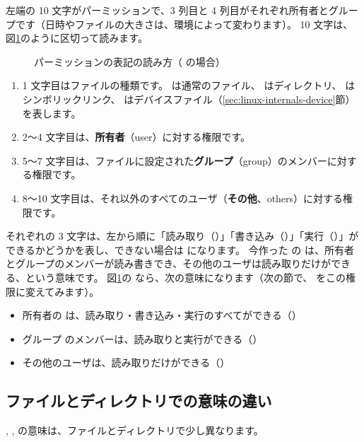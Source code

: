 左端の 10 文字がパーミッションで、3 列目と 4 列目がそれぞれ所有者とグループです（日時やファイルの大きさは、環境によって変わります）。
10 文字は、図\ref{fig:permission-string}のように区切って読みます。

\begin{figure}[tb]
  \centering
  
  \caption{パーミッションの表記の読み方（ の場合）}
  \label{fig:permission-string}
\end{figure}

\begin{enumerate}
  \item 1 文字目はファイルの種類です。\cmd{-} は通常のファイル、 はディレクトリ、 はシンボリックリンク、 はデバイスファイル（\ref{sec:linux-internals-device}節）を表します。
  \item 2〜4 文字目は、\textbf{所有者}（user）に対する権限です。
  \item 5〜7 文字目は、ファイルに設定された\textbf{グループ}（group）のメンバーに対する権限です。
  \item 8〜10 文字目は、それ以外のすべてのユーザ（\textbf{その他}、others）に対する権限です。
\end{enumerate}

それぞれの 3 文字は、左から順に「読み取り（）」「書き込み（）」「実行（）」ができるかどうかを表し、できない場合は \cmd{-} になります。
今作った  の  は、所有者とグループのメンバーが読み書きでき、その他のユーザは読み取りだけができる、という意味です。
図\ref{fig:permission-string}の  なら、次の意味になります（次の節で、 をこの権限に変えてみます）。

\begin{itemize}
  \item 所有者の  は、読み取り・書き込み・実行のすべてができる（）
  \item グループ  のメンバーは、読み取りと実行ができる（）
  \item その他のユーザは、読み取りだけができる（）
\end{itemize}

\subsection{ファイルとディレクトリでの意味の違い}

, ,  の意味は、ファイルとディレクトリで少し異なります。

